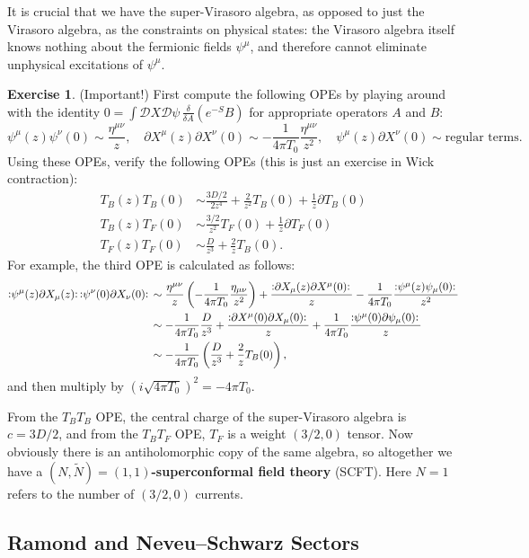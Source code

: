 \documentclass{report}
\theoremstyle{plain}
\theoremstyle{definition}
\newtheorem{exercise}{Exercise}[section]
\theoremstyle{remark}
\newcommand{\di}{\partial}
\newcommand{\NO}[1]{\vcentcolon\mathrel{#1}\vcentcolon\,}
\newcommand{\cD}{\mathcal{D}}
\newcommand{\fder}[2]{\frac{\delta #1}{\delta #2}}
\begin{document}
It is crucial that we have the super-Virasoro algebra, as opposed to
just the Virasoro algebra, as the constraints on physical states: the
Virasoro algebra itself knows nothing about the fermionic fields
$\psi^\mu$, and therefore cannot eliminate unphysical excitations of
$\psi^\mu$.

\begin{exercise} (Important!)
  First compute the following OPEs by playing around with the identity
  $0 = \int \cD X \cD \psi \, \fder{}{A} (e^{-S} B)$ for appropriate
  operators $A$ and $B$:
  \[ \psi^\mu(z) \psi^\nu(0) \sim \frac{\eta^{\mu\nu}}{z}, \quad \di X^\mu(z) \di X^\nu(0) \sim -\frac{1}{4\pi T_0} \frac{\eta^{\mu\nu}}{z^2}, \quad \psi^\mu(z) \di X^\nu(0) \sim \text{regular terms}. \]
  Using these OPEs, verify the following OPEs (this is just an
  exercise in Wick contraction):
  \begin{align*}
    T_B(z) T_B(0) &\sim \frac{3D/2}{2z^4} + \frac{2}{z^2} T_B(0) + \frac{1}{z} \di T_B(0) \\
    T_B(z) T_F(0) &\sim \frac{3/2}{z^2} T_F(0) + \frac{1}{z} \di T_F(0) \\
    T_F(z) T_F(0) &\sim \frac{D}{z^3} + \frac{2}{z} T_B(0).
  \end{align*}
  For example, the third OPE is calculated as follows:
  \begin{align*}
    \NO{\psi^\mu (z) \di X_\mu(z)} \NO{\psi^\nu (0) \di X_\nu(0)}
    &\sim \frac{\eta^{\mu\nu}}{z} \left(-\frac{1}{4\pi T_0}\frac{\eta_{\mu\nu}}{z^2}\right) + \frac{\NO{\di X_\mu(z) \di X^\mu(0)}}{z} - \frac{1}{4\pi T_0} \frac{\NO{\psi^\mu(z) \psi_\mu(0)}}{z^2} \\
    &\sim -\frac{1}{4\pi T_0} \frac{D}{z^3} + \frac{\NO{\di X^\mu(0) \di X_\mu(0)}}{z} + \frac{1}{4\pi T_0} \frac{\NO{\psi^\mu(0) \di\psi_\mu(0)}}{z} \\
    &\sim -\frac{1}{4\pi T_0} \left(\frac{D}{z^3} + \frac{2}{z} T_B(0)\right),
  \end{align*}
  and then multiply by $(i\sqrt{4\pi T_0})^2 = -4\pi T_0$.
\end{exercise}

From the $T_B T_B$ OPE, the central charge of the super-Virasoro
algebra is $c = 3D/2$, and from the $T_B T_F$ OPE, $T_F$ is a weight
$(3/2, 0)$ tensor. Now obviously there is an antiholomorphic copy of
the same algebra, so altogether we have a {\bf $(N, \tilde{N}) = (1,
  1)$-superconformal field theory} (SCFT). Here $N = 1$ refers to the
number of $(3/2, 0)$ currents.

\subsection{Ramond and Neveu--Schwarz Sectors}
\end{document}
